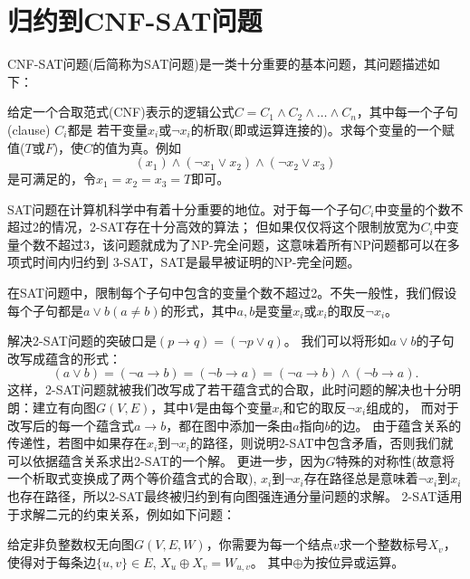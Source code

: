 
\section{归约到CNF-SAT问题}

CNF-SAT问题(后简称为SAT问题)是一类十分重要的基本问题，其问题描述如下：

\begin{prob}
 给定一个合取范式(CNF)表示的逻辑公式$C = C_1 \land C_2 \land \ldots \land C_n$，其中每一个子句(clause) $C_i$都是
 若干变量$x_i$或$\neg x_i$的析取(即或运算连接的)。求每个变量的一个赋值($T$或$F$)，使$C$的值为真。例如
 $$(x_1)\land(\neg x_1 \lor x_2)\land(\neg x_2 \lor x_3)$$
 是可满足的，令$x_1=x_2=x_3=T$即可。
\end{prob}

SAT问题在计算机科学中有着十分重要的地位。对于每一个子句$C_i$中变量的个数不超过2的情况，2-SAT存在十分高效的算法；
但如果仅仅将这个限制放宽为$C_i$中变量个数不超过3，该问题就成为了NP-完全问题，这意味着所有NP问题都可以在多项式时间内归约到
3-SAT，SAT是最早被证明的NP-完全问题。

\begin{prob}[2-SAT]
 在SAT问题中，限制每个子句中包含的变量个数不超过2。不失一般性，我们假设每个子句都是$a\lor b (a \neq b)$的形式，其中$a, b$是变量$x_i$或$x_i$的取反$\neg x_i$。
\end{prob}

解决2-SAT问题的突破口是$(p\to q) = (\neg p \lor q)$。
我们可以将形如$a\lor b$的子句改写成蕴含的形式：$$(a\lor b) = (\neg a \to b) = (\neg b \to a) = (\neg a \to b) \land (\neg b \to a).$$
这样，2-SAT问题就被我们改写成了若干蕴含式的合取，此时问题的解决也十分明朗：建立有向图$G(V,E)$，其中$V$是由每个变量$x_i$和它的取反$\neg x_i$组成的，
而对于改写后的每一个蕴含式$a\to b$，都在图中添加一条由$a$指向$b$的边。
由于蕴含关系的传递性，若图中如果存在$x_i$到$\neg x_i$的路径，则说明2-SAT中包含矛盾，否则我们就可以依据蕴含关系求出2-SAT的一个解。
更进一步，因为$G$特殊的对称性(故意将一个析取式变换成了两个等价蕴含式的合取), $x_i$到$\neg x_i$存在路径总是意味着$\neg x_i$到$x_i$也存在路径，所以2-SAT最终被归约到有向图强连通分量问题的求解。
2-SAT适用于求解二元的约束关系，例如如下问题：
\begin{prob}
 给定非负整数权无向图$G(V, E, W)$，你需要为每一个结点$v$求一个整数标号$X_v$，使得对于每条边$\{u, v\}\in E$, $X_u \oplus X_v = W_{u,v}$。
 其中$\oplus$为按位异或运算。
\end{prob}

